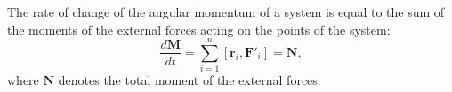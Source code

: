 The rate of change of the angular momentum of a system is equal to the sum of the moments of the external forces acting on the points of the system:
$$\frac{d\mathbf{M}}{dt} = \sum_{i=1}^{n} [\mathbf{r}_i, \mathbf{F}'_i] = \mathbf{N},$$
where $\mathbf{N}$ denotes the total moment of the external forces.

